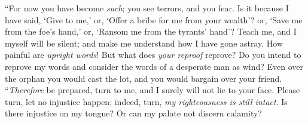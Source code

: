 \begin{biblechapter}
\verse “For now you have become \textit{such}; 
you see terrors, and you fear.
\verse Is it because I have said, ‘Give to me,’ 
or, ‘Offer a bribe for me from your wealth’?
\verse or, ‘Save me from the foe’s hand,’ 
or, ‘Ransom me from the tyrants’ hand’?
\verse Teach me, and I myself will be silent; 
and make me understand how I have gone astray.
\verse How painful are \textit{upright words}! 
But what does \textit{your reproof} reprove?
\verse Do you intend to reprove my words 
and consider the words of a desperate man as wind?
\verse Even over the orphan you would cast the lot, 
and you would bargain over your friend.
\verse “\textit{Therefore} be prepared, turn to me, 
and I surely will not lie to your face.
\verse Please turn, let no injustice happen; 
indeed, turn, \textit{my righteousness is still intact}.
\verse Is there injustice on my tongue? 
Or can my palate not discern calamity?
\end{biblechapter}

